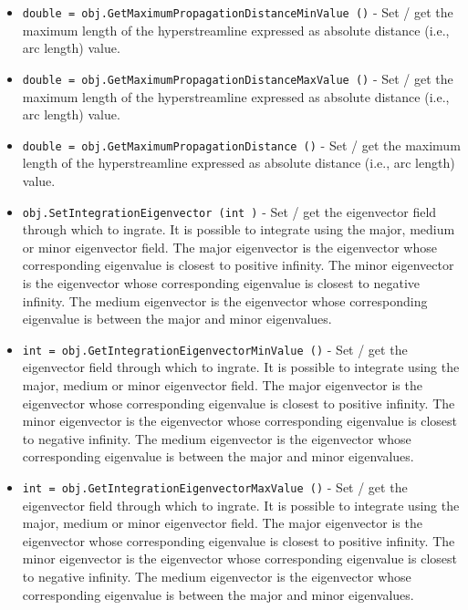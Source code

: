 \begin{itemize}
\item  \verb|double = obj.GetMaximumPropagationDistanceMinValue ()| -  Set / get the maximum length of the hyperstreamline expressed as absolute
 distance (i.e., arc length) value.

\item  \verb|double = obj.GetMaximumPropagationDistanceMaxValue ()| -  Set / get the maximum length of the hyperstreamline expressed as absolute
 distance (i.e., arc length) value.

\item  \verb|double = obj.GetMaximumPropagationDistance ()| -  Set / get the maximum length of the hyperstreamline expressed as absolute
 distance (i.e., arc length) value.

\item  \verb|obj.SetIntegrationEigenvector (int )| -  Set / get the eigenvector field through which to ingrate. It is
 possible to integrate using the major, medium or minor
 eigenvector field.  The major eigenvector is the eigenvector
 whose corresponding eigenvalue is closest to positive infinity.
 The minor eigenvector is the eigenvector whose corresponding
 eigenvalue is closest to negative infinity.  The medium
 eigenvector is the eigenvector whose corresponding eigenvalue is
 between the major and minor eigenvalues.

\item  \verb|int = obj.GetIntegrationEigenvectorMinValue ()| -  Set / get the eigenvector field through which to ingrate. It is
 possible to integrate using the major, medium or minor
 eigenvector field.  The major eigenvector is the eigenvector
 whose corresponding eigenvalue is closest to positive infinity.
 The minor eigenvector is the eigenvector whose corresponding
 eigenvalue is closest to negative infinity.  The medium
 eigenvector is the eigenvector whose corresponding eigenvalue is
 between the major and minor eigenvalues.

\item  \verb|int = obj.GetIntegrationEigenvectorMaxValue ()| -  Set / get the eigenvector field through which to ingrate. It is
 possible to integrate using the major, medium or minor
 eigenvector field.  The major eigenvector is the eigenvector
 whose corresponding eigenvalue is closest to positive infinity.
 The minor eigenvector is the eigenvector whose corresponding
 eigenvalue is closest to negative infinity.  The medium
 eigenvector is the eigenvector whose corresponding eigenvalue is
 between the major and minor eigenvalues.


\end{itemize}
